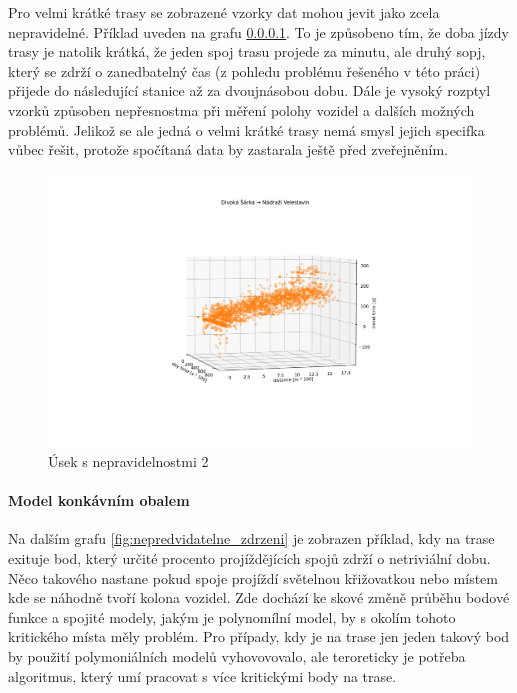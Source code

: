 Pro velmi krátké trasy se zobrazené vzorky dat mohou jevit jako zcela nepravidelné. Příklad uveden na grafu \ref{}. To je způsobeno tím, že doba jízdy trasy je natolik krátká, že jeden spoj trasu projede za minutu, ale druhý sopj, který se zdrží o zanedbatelný čas (z pohledu problému řešeného v této práci) přijede do následující stanice až za dvoujnásobou dobu. Dále je vysoký rozptyl vzorků způsoben nepřesnostma při měření polohy vozidel a dalších možných problémů. Jelikož se ale jedná o velmi krátké trasy nemá smysl jejich specifka vůbec řešit, protože spočítaná data by zastarala ještě před zveřejněním.

\begin{figure}
	\centering
  \includegraphics[width=\linewidth]{../img/divoka_sarka_veleslavin.png}
  \caption{Úsek s nepravidelnostmi 2}
  \label{fig:divoka_sarka_veleslavin}
\end{figure}

\paragraph{Model konkávním obalem}

Na dalším grafu \ref{fig:nepredvidatelne_zdrzeni} je zobrazen příklad, kdy na trase exituje bod, který určité procento projíždějících spojů zdrží o netriviální dobu. Něco takového nastane pokud spoje projíždí světelnou křižovatkou nebo místem kde se náhodně tvoří kolona vozidel. Zde dochází ke skové změně průběhu bodové funkce a spojité modely, jakým je polynomílní model, by s okolím tohoto kritického místa měly problém. Pro případy, kdy je na trase jen jeden takový bod by použití polymoniálních modelů vyhovovovalo, ale teroreticky je potřeba algoritmus, který umí pracovat s více kritickými body na trase.


